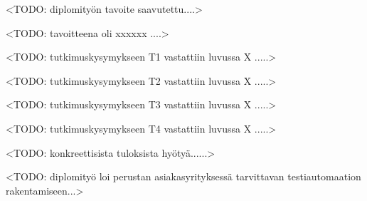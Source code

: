 <TODO: diplomityön tavoite saavutettu....>

<TODO: tavoitteena oli xxxxxx ....>

<TODO: tutkimuskysymykseen T1 vastattiin luvussa X .....>

<TODO: tutkimuskysymykseen T2 vastattiin luvussa X .....>

<TODO: tutkimuskysymykseen T3 vastattiin luvussa X .....>

<TODO: tutkimuskysymykseen T4 vastattiin luvussa X .....>

<TODO: konkreettisista tuloksista hyötyä......>

<TODO: diplomityö loi perustan asiakasyrityksessä tarvittavan testiautomaation rakentamiseen...>